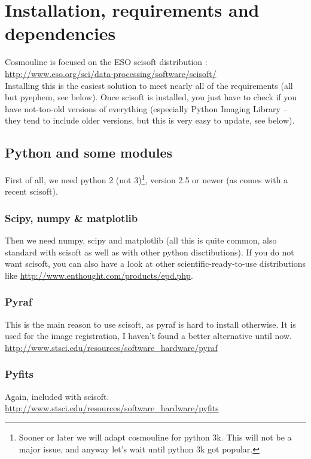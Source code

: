 
\section{Installation, requirements and dependencies}


Cosmouline is focused on the ESO scisoft distribution : \\
\url{http://www.eso.org/sci/data-processing/software/scisoft/}\\
Installing this is the easiest solution to meet nearly all of the requirements (all but pyephem, see below). Once scisoft is installed, you just have to check if you have not-too-old versions of everything (especially Python Imaging Library -- they tend to include older versions, but this is very easy to update, see below).

\subsection{Python and some modules}

First of all, we need python 2 (not 3)\footnote{Sooner or later we will adapt cosmouline for python 3k. This will not be a major issue, and anyway let's wait until python 3k got popular.}, version 2.5 or newer (as comes with a recent scisoft).

\subsubsection{Scipy, numpy \& matplotlib}

Then we need numpy, scipy and matplotlib (all this is quite common, also standard with scisoft as well as with other python disctibutions). If you do not want scisoft, you can also have a look at other scientific-ready-to-use distributions like \url{http://www.enthought.com/products/epd.php}.

\subsubsection{Pyraf}
This is the main reason to use scisoft, as pyraf is hard to install otherwise. It is used for the image registration, I haven't found a better alternative until now.
\url{http://www.stsci.edu/resources/software_hardware/pyraf}

\subsubsection{Pyfits}
Again, included with scisoft.\\
\url{http://www.stsci.edu/resources/software_hardware/pyfits}


